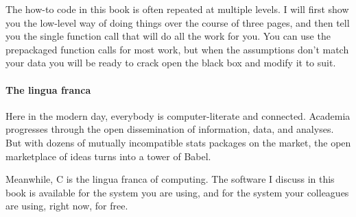 The how-to code in this book is often repeated at multiple levels. I
will first show you the low-level way of doing things over the course
of three pages, and then tell you the single function call that will do
all the work for you. You can use the prepackaged function calls for
most work, but when the assumptions don't match your data you will be
ready to crack open the black box and modify it to suit.

\paragraph{The lingua franca}
Here in the modern day, everybody is computer-literate and connected.
Academia progresses through the open dissemination of information, data,
and analyses. But with dozens of mutually incompatible stats packages
on the market, the open marketplace of ideas turns into a tower of Babel.

Meanwhile, C is the lingua franca of computing. The software I discuss
in this book is available for the system you are using, and for the
system your colleagues are using, right now, for free.

